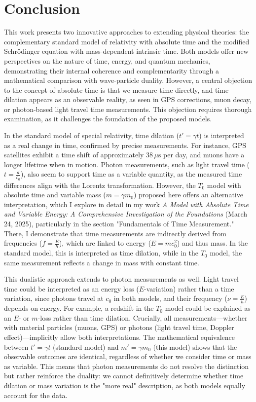 \documentclass[a4paper,12pt]{article}
\begin{document}
	\section{Conclusion}
	This work presents two innovative approaches to extending physical theories: the complementary standard model of relativity with absolute time and the modified Schrödinger equation with mass-dependent intrinsic time. Both models offer new perspectives on the nature of time, energy, and quantum mechanics, demonstrating their internal coherence and complementarity through a mathematical comparison with wave-particle duality. However, a central objection to the concept of absolute time is that we measure time directly, and time dilation appears as an observable reality, as seen in GPS corrections, muon decay, or photon-based light travel time measurements. This objection requires thorough examination, as it challenges the foundation of the proposed models.
	
	In the standard model of special relativity, time dilation (\( t' = \gamma t \)) is interpreted as a real change in time, confirmed by precise measurements. For instance, GPS satellites exhibit a time shift of approximately \( 38 \, \mu\text{s} \) per day, and muons have a longer lifetime when in motion. Photon measurements, such as light travel time (\( t = \frac{d}{c_0} \)), also seem to support time as a variable quantity, as the measured time differences align with the Lorentz transformation. However, the \( T_0 \) model with absolute time and variable mass (\( m = \gamma m_0 \)) proposed here offers an alternative interpretation, which I explore in detail in my work \textit{A Model with Absolute Time and Variable Energy: A Comprehensive Investigation of the Foundations} (March 24, 2025), particularly in the section "Fundamentals of Time Measurement." There, I demonstrate that time measurements are indirectly derived from frequencies (\( f = \frac{E}{h} \)), which are linked to energy (\( E = m c_0^2 \)) and thus mass. In the standard model, this is interpreted as time dilation, while in the \( T_0 \) model, the same measurement reflects a change in mass with constant time.
	
	This dualistic approach extends to photon measurements as well. Light travel time could be interpreted as an energy loss (\( E \)-variation) rather than a time variation, since photons travel at \( c_0 \) in both models, and their frequency (\( \nu = \frac{E}{h} \)) depends on energy. For example, a redshift in the \( T_0 \) model could be explained as an \( E \)- or \( m \)-loss rather than time dilation. Crucially, all measurements—whether with material particles (muons, GPS) or photons (light travel time, Doppler effect)—implicitly allow both interpretations. The mathematical equivalence between \( t' = \gamma t \) (standard model) and \( m' = \gamma m_0 \) (this model) shows that the observable outcomes are identical, regardless of whether we consider time or mass as variable. This means that photon measurements do not resolve the distinction but rather reinforce the duality: we cannot definitively determine whether time dilation or mass variation is the "more real" description, as both models equally account for the data.
	
\end{document}
